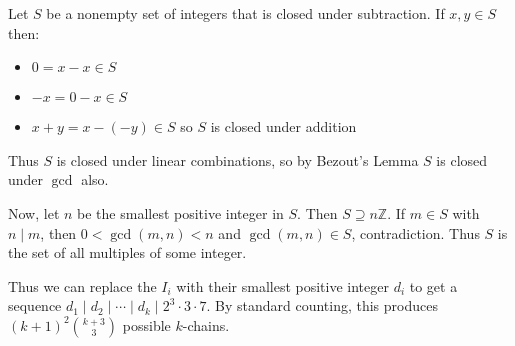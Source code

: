 Let $S$ be a nonempty set of integers that is closed under subtraction. If $x,y\in S$ then:
\begin{itemize}
	\item $0=x-x\in S$
	\item $-x=0-x\in S$
	\item $x+y=x-(-y)\in S$ so $S$ is closed under addition
\end{itemize}

Thus $S$ is closed under linear combinations, so by Bezout's Lemma $S$ is closed under $\gcd$ also.

Now, let $n$ be the smallest positive integer in $S$. Then $S\supseteq n\mathbb{Z}$. If $m\in S$ with $n\mid m$, then $0<\gcd(m,n)<n$ and $\gcd(m,n)\in S$, contradiction. Thus $S$ is the set of all multiples of some integer.

Thus we can replace the $I_i$ with their smallest positive integer $d_i$ to get a sequence $d_1\mid d_2\mid\cdots\mid d_k\mid 2^3\cdot3\cdot7$. By standard counting, this produces $\boxed{(k+1)^2\binom{k+3}{3}}$ possible $k$-chains.
